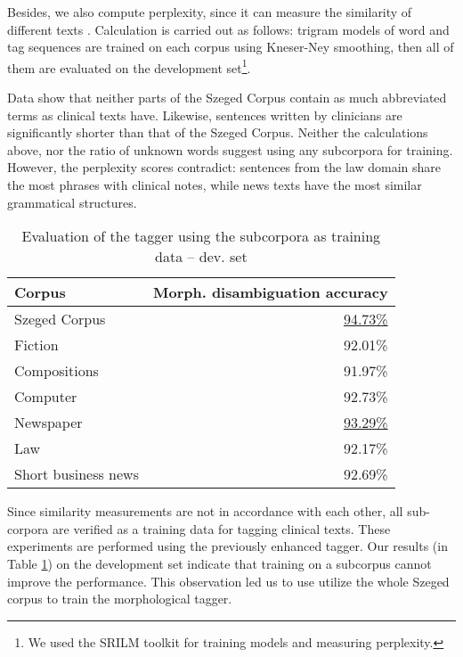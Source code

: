 Besides, we also compute perplexity, since it can measure the similarity of different texts \cite{kilgarriff1998measures}. 
Calculation is carried out as follows: trigram models of word and tag sequences are trained on each corpus using Kneser-Ney smoothing, then all of them are evaluated on the development set\footnote{We used the SRILM toolkit \cite{stolcke2002srilm} for training models and measuring perplexity.}.

Data show that neither parts of the Szeged Corpus contain as much abbreviated terms as clinical texts have. 
Likewise, sentences written by clinicians are significantly shorter than that of the Szeged Corpus. 
Neither the calculations above, nor the ratio of unknown words suggest using any subcorpora for training. 
However, the perplexity scores contradict: sentences from the law domain share the most phrases with clinical notes, while news texts have the most similar grammatical structures. 

\begin{table}[H]
\centering
\caption{Evaluation of the tagger using the subcorpora as training data -- dev. set}
\label{tab:eval_subcorpora}
\begin{tabular}{ l r } 
\hline
Corpus & Morph. disambiguation accuracy \\
\hline
Szeged Corpus & \underline{94.73\%} \\
\hspace{0.2cm} Fiction & 92.01\% \\
\hspace{0.2cm} Compositions & 91.97\% \\
\hspace{0.2cm} Computer & 92.73\% \\
\hspace{0.2cm} Newspaper & \underline{93.29\%} \\
\hspace{0.2cm} Law & 92.17\% \\
\hspace{0.2cm} Short business news & 92.69\% \\
\hline
\end{tabular}
\end{table}


Since similarity measurements are not in accordance with each other, all sub-corpora are verified as a training data for tagging clinical texts. 
These experiments are performed using the previously enhanced tagger. 
Our results (in Table  \ref{tab:eval_subcorpora}) on the development set indicate that training on a subcorpus cannot improve the performance. %
This observation led us to use utilize the whole Szeged corpus to train the morphological tagger.


